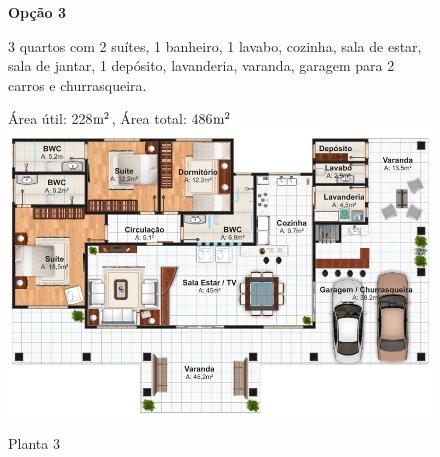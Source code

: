 \begin{figure}
\textbf{Opção 3}

	3 quartos com 2 suítes, 1 banheiro, 1 lavabo, cozinha, sala de estar, sala de jantar, 1 depósito, lavanderia, varanda, garagem para 2 carros e churrasqueira.
	
Área útil: 228$\textup{m}^{2}$, Área total: 486$\textup{m}^{2}$
\centering
\includegraphics[keepaspectratio,scale=0.5]{images/planta3.png}
\caption{Planta 3\cite{planta3}}

\end{figure}
\pagebreak